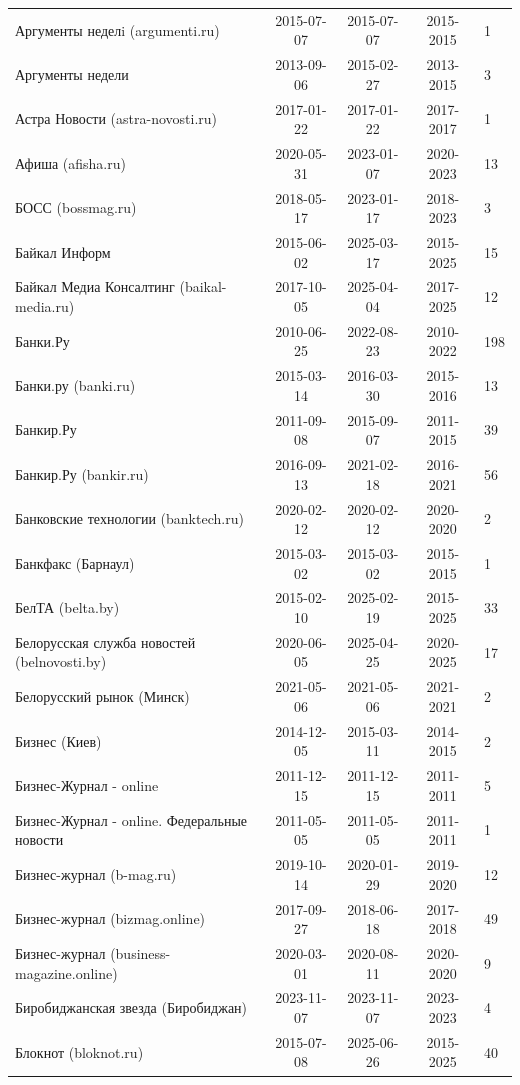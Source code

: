 \begin{longtable}{p{6cm}cccp{2cm}}
Аргументы неделi (argumenti.ru) & 2015-07-07 & 2015-07-07 & 2015-2015 & 1\\
Аргументы недели & 2013-09-06 & 2015-02-27 & 2013-2015 & 3\\
Астра Новости (astra-novosti.ru) & 2017-01-22 & 2017-01-22 & 2017-2017 & 1\\
Афиша (afisha.ru) & 2020-05-31 & 2023-01-07 & 2020-2023 & 13\\
БОСС (bossmag.ru) & 2018-05-17 & 2023-01-17 & 2018-2023 & 3\\
Байкал Информ & 2015-06-02 & 2025-03-17 & 2015-2025 & 15\\
Байкал Медиа Консалтинг (baikal-media.ru) & 2017-10-05 & 2025-04-04 & 2017-2025 & 12\\
Банки.Ру & 2010-06-25 & 2022-08-23 & 2010-2022 & 198\\
Банки.ру (banki.ru) & 2015-03-14 & 2016-03-30 & 2015-2016 & 13\\
Банкир.Ру & 2011-09-08 & 2015-09-07 & 2011-2015 & 39\\
Банкир.Ру (bankir.ru) & 2016-09-13 & 2021-02-18 & 2016-2021 & 56\\
Банковские технологии (banktech.ru) & 2020-02-12 & 2020-02-12 & 2020-2020 & 2\\
Банкфакс (Барнаул) & 2015-03-02 & 2015-03-02 & 2015-2015 & 1\\
БелТА (belta.by) & 2015-02-10 & 2025-02-19 & 2015-2025 & 33\\
Белорусская служба новостей (belnovosti.by) & 2020-06-05 & 2025-04-25 & 2020-2025 & 17\\
Белорусский рынок (Минск) & 2021-05-06 & 2021-05-06 & 2021-2021 & 2\\
Бизнес (Киев) & 2014-12-05 & 2015-03-11 & 2014-2015 & 2\\
Бизнес-Журнал - online & 2011-12-15 & 2011-12-15 & 2011-2011 & 5\\
Бизнес-Журнал - online. Федеральные новости & 2011-05-05 & 2011-05-05 & 2011-2011 & 1\\
Бизнес-журнал (b-mag.ru) & 2019-10-14 & 2020-01-29 & 2019-2020 & 12\\
Бизнес-журнал (bizmag.online) & 2017-09-27 & 2018-06-18 & 2017-2018 & 49\\
Бизнес-журнал (business-magazine.online) & 2020-03-01 & 2020-08-11 & 2020-2020 & 9\\
Биробиджанская звезда (Биробиджан) & 2023-11-07 & 2023-11-07 & 2023-2023 & 4\\
Блокнот (bloknot.ru) & 2015-07-08 & 2025-06-26 & 2015-2025 & 40\\

\end{longtable}
